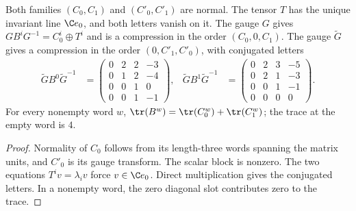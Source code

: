 \begin{lemma}
    \label{lem:asym_example_worked_reductions}
    \leanok
    Both families $(C_0,C_1)$ and $(C'_0,C'_1)$ are normal. The tensor $T$
    has the unique invariant line $\C e_0$, and both letters vanish on it.
    The gauge $G$ gives $GB^iG^{-1}=C_0^i\oplus T^i$ and is a compression
    in the order $(C_0,0,C_1)$. The gauge $\widetilde G$ gives a compression
    in the order $(0,C'_1,C'_0)$, with conjugated letters
    \begin{align}
        \widetilde GB^0\widetilde G^{-1}
         & =\begin{pmatrix}0&2&2&-3\\0&1&2&-4\\0&0&1&0\\0&0&1&-1\end{pmatrix}, &
        \widetilde GB^1\widetilde G^{-1}
         & =\begin{pmatrix}0&2&3&-5\\0&2&1&-3\\0&0&1&-1\\0&0&0&0\end{pmatrix}.
    \end{align}
    For every nonempty word $w$,
    $\tr(B^w)=\tr(C_0^w)+\tr(C_1^w)$; the trace at the empty word is $4$.
\end{lemma}

\begin{proof}
    \leanok
    Normality of $C_0$ follows from its length-three words spanning the matrix
    units, and $C'_0$ is its gauge transform. The scalar block is nonzero.
    The two equations $T^iv=\lambda_i v$ force $v\in\C e_0$.
    Direct multiplication gives the conjugated letters. In a nonempty word,
    the zero diagonal slot contributes zero to the trace.
\end{proof}

